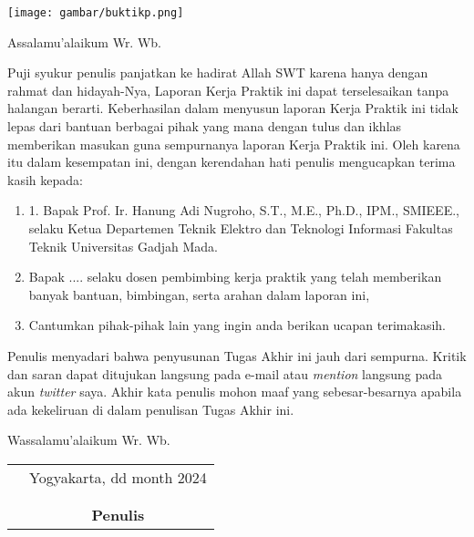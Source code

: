 \documentclass{jtetikp}
\begin{document}
\cover

\approvalpage

\proof
\texttt{[image: gambar/buktikp.png]}

\preface
Assalamu'alaikum Wr. Wb.

\vspace{0.5cm}

Puji syukur penulis panjatkan ke hadirat Allah SWT karena hanya dengan rahmat dan hidayah-Nya, Laporan Kerja Praktik ini dapat terselesaikan tanpa halangan berarti. Keberhasilan dalam menyusun laporan Kerja Praktik ini tidak lepas dari bantuan berbagai pihak yang mana dengan tulus dan ikhlas memberikan masukan guna sempurnanya laporan Kerja Praktik ini. Oleh karena itu dalam kesempatan ini, dengan kerendahan hati penulis mengucapkan terima kasih kepada:

\begin{enumerate}
\item{1.	Bapak Prof. Ir. Hanung Adi Nugroho, S.T., M.E., Ph.D., IPM., SMIEEE., selaku Ketua Departemen Teknik Elektro dan Teknologi Informasi Fakultas Teknik Universitas Gadjah Mada.}
\item{Bapak .... selaku dosen pembimbing kerja praktik yang telah memberikan banyak bantuan, bimbingan, serta arahan dalam laporan ini,}
\item{Cantumkan pihak-pihak lain yang ingin anda berikan ucapan terimakasih.}
\end{enumerate}

Penulis menyadari bahwa penyusunan Tugas Akhir ini jauh dari sempurna. Kritik dan saran dapat ditujukan langsung pada e-mail atau \emph{mention} langsung pada akun \emph{twitter} saya. Akhir kata penulis mohon maaf yang sebesar-besarnya apabila ada kekeliruan di dalam penulisan Tugas Akhir ini.

\vspace{0.5cm}

Wassalamu'alaikum Wr. Wb.

\begin{tabular}{p{7.5cm}c}
&Yogyakarta, dd month 2024\\
&\\
&\\
&\textbf{Penulis}
\end{tabular}
\end{document}
